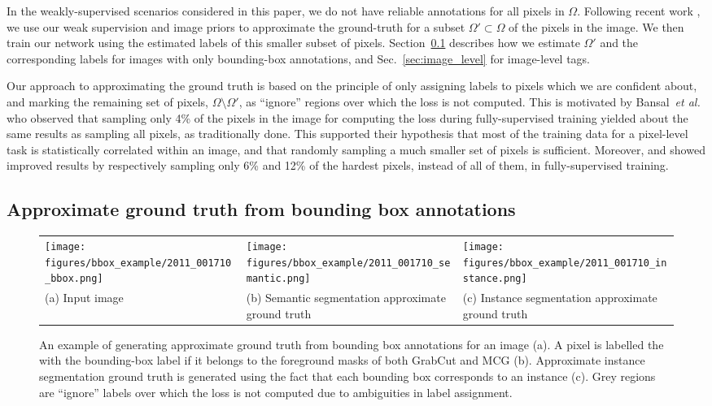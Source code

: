 \documentclass[runningheads]{llncs}
\def\etal{\emph{et al.} }
\begin{document}
In the weakly-supervised scenarios considered in this paper, we do not have reliable annotations for all pixels in $\Omega$.
Following recent work \cite{khoreva_cvpr_2017,kolesnikov_eccv_2016,bearman_arxiv_2015,pathak_iccv_2015}, we use our weak supervision and image priors to approximate the ground-truth for a subset $\Omega' \subset \Omega$ of the pixels in the image.
We then train our network using the estimated labels of this smaller subset of pixels.
Section~\ref{sec:bounding_box} describes how we estimate $\Omega'$ and the corresponding labels for images with only bounding-box annotations, and Sec.~\ref{sec:image_level} for image-level tags.

Our approach to approximating the ground truth is based on the principle of only assigning labels to pixels which we are confident about, and marking the remaining set of pixels, $\Omega \setminus \Omega'$, as ``ignore'' regions over which the loss is not computed.
This is motivated by Bansal~\etal\cite{bansal_arxiv_2017} who observed that sampling only 4\% of the pixels in the image for computing the loss during fully-supervised training yielded about the same results as sampling all pixels, as traditionally done.
This supported their hypothesis that most of the training data for a pixel-level task is statistically correlated within an image, and that randomly sampling a much smaller set of pixels is sufficient. 
Moreover, \cite{pohlen_cvpr_2017} and \cite{li_bmvc_2017} showed improved results by respectively sampling only 6\% and 12\% of the hardest pixels, instead of all of them, in fully-supervised training.

\subsection{Approximate ground truth from bounding box annotations}
\label{sec:bounding_box}
\begin{figure}[!t]
\centering

\begin{tabularx}{\linewidth}{ Y Y Y }
\texttt{[image: figures/bbox\_example/2011\_001710\_bbox.png]} &
\texttt{[image: figures/bbox\_example/2011\_001710\_semantic.png]} &
\texttt{[image: figures/bbox\_example/2011\_001710\_instance.png]}
\\
(a) Input image & (b) Semantic segmentation approximate ground truth & (c) Instance segmentation approximate ground truth
\end{tabularx}
\caption{An example of generating approximate ground truth from bounding box annotations for an image (a). A pixel is labelled the with the bounding-box label if it belongs to the foreground masks of both GrabCut \cite{rother_2004} and MCG \cite{arbelaez_2014} (b). Approximate instance segmentation ground truth is generated using the fact that each bounding box corresponds to an instance (c). Grey regions are ``ignore'' labels over which the loss is not computed due to ambiguities in label assignment.}
\label{fig:bbox_example}

\end{figure}
 
\end{document}
